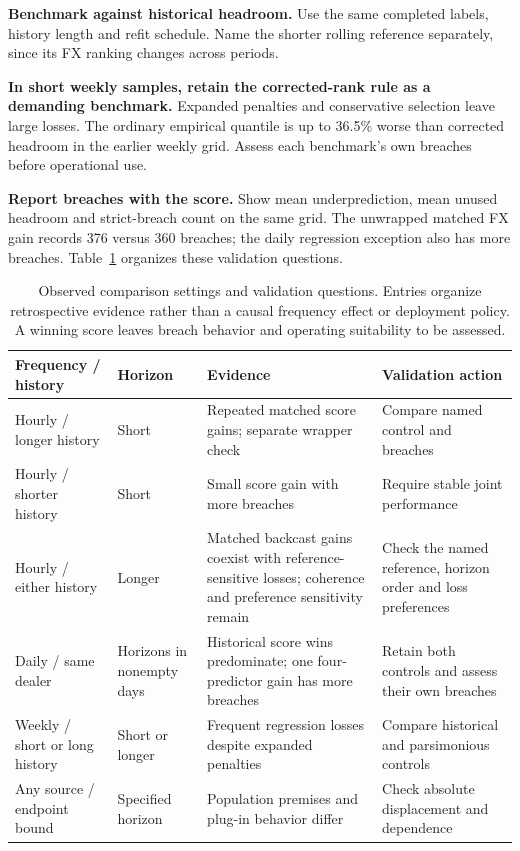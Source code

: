\documentclass[11pt,a4paper]{article}
\begin{document}
\textbf{Benchmark against historical headroom.} Use the same completed labels, history length and refit schedule. Name the shorter rolling reference separately, since its FX ranking changes across periods.

\textbf{In short weekly samples, retain the corrected-rank rule as a demanding benchmark.} Expanded penalties and conservative selection leave large losses. The ordinary empirical quantile is up to 36.5\% worse than corrected headroom in the earlier weekly grid. Assess each benchmark's own breaches before operational use.

\textbf{Report breaches with the score.} Show mean underprediction, mean unused headroom and strict-breach count on the same grid. The unwrapped matched FX gain records 376 versus 360 breaches; the daily regression exception also has more breaches. Table~\ref{tab:map} organizes these validation questions.

\begin{table}[htbp]\centering\small
\caption{Observed comparison settings and validation questions. Entries organize retrospective evidence rather than a causal frequency effect or deployment policy. A winning score leaves breach behavior and operating suitability to be assessed.}\label{tab:map}
\begin{tabular}{>{\raggedright\arraybackslash}p{3.3cm}>{\raggedright\arraybackslash}p{3.7cm}>{\raggedright\arraybackslash}p{4.0cm}>{\raggedright\arraybackslash}p{3.2cm}}\toprule
Frequency / history & Horizon & Evidence & Validation action\\\midrule
Hourly / longer history & Short & Repeated matched score gains; separate wrapper check & Compare named control and breaches\\
Hourly / shorter history & Short & Small score gain with more breaches & Require stable joint performance\\
Hourly / either history & Longer & Matched backcast gains coexist with reference-sensitive losses; coherence and preference sensitivity remain & Check the named reference, horizon order and loss preferences\\
Daily / same dealer & Horizons in nonempty days & Historical score wins predominate; one four-predictor gain has more breaches & Retain both controls and assess their own breaches\\
Weekly / short or long history & Short or longer & Frequent regression losses despite expanded penalties & Compare historical and parsimonious controls\\
Any source / endpoint bound & Specified horizon & Population premises and plug-in behavior differ & Check absolute displacement and dependence\\
\bottomrule\end{tabular}

\end{table}
\end{document}
